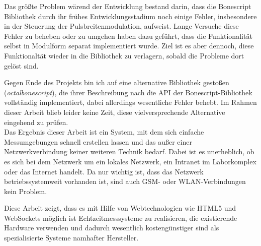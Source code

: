 Das größte Problem wärend der Entwicklung bestand darin, dass die Bonescript Bibliothek durch ihr frühes Entwicklungsstadium noch einige Fehler, insbesondere in der Steuerung der Pulsbreitenmodulation, aufweist. Lange Versuche diese Fehler zu beheben oder zu umgehen haben dazu geführt, dass die Funktionalität selbst in Modulform separat implementiert wurde. Ziel ist es aber dennoch, diese Funktionaltät wieder in die Bibliothek zu verlagern, sobald die Probleme dort gelöst sind. 

Gegen Ende des Projekts bin ich auf eine alternative Bibliothek gestoßen (\textit{octalbonescript}), die ihrer Beschreibung nach die API der Bonescript-Bibliothek vollständig implementiert, dabei allerdings wesentliche Fehler behebt. Im Rahmen dieser Arbeit blieb leider keine Zeit, diese vielversprechende Alternative eingehend zu prüfen.\\

Das Ergebnis dieser Arbeit ist ein System, mit dem sich einfache Messumgebungen schnell erstellen lassen und das außer einer Netzwerkverbindung keiner weiteren Technik bedarf. Dabei ist es unerheblich, ob es sich bei dem Netzwerk um ein lokales Netzwerk, ein Intranet im Laborkomplex oder das Internet handelt. Da nur wichtig ist, dass das Netzwerk betriebssystemweit vorhanden ist, sind auch GSM- oder WLAN-Verbindungen kein Problem.

Diese Arbeit zeigt, dass es mit Hilfe von Webtechnologien wie HTML5 und WebSockets möglich ist Echtzeitmesssysteme zu realisieren, die existierende Hardware verwenden und dadurch wesentlich kostengünstiger sind als spezialisierte Systeme namhafter Hersteller.